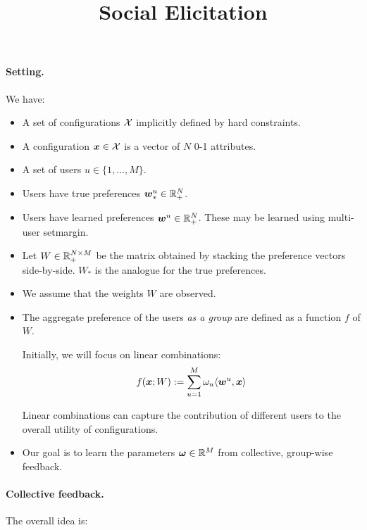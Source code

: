 \documentclass[12pt,a4paper]{article}
\title{Social Elicitation}
\begin{document}
\maketitle

\paragraph{Setting.} We have:

\begin{itemize}

    \item A set of configurations $\mathcal{X}$ implicitly defined by hard constraints.

    \item A configuration $\boldsymbol{x} \in \mathcal{X}$ is a vector of $N$ 0-1 attributes.

    \item A set of users $u \in \{1, \ldots, M\}$.

    \item Users have true preferences $\boldsymbol{w}^u_* \in \mathbb{R}^N_+$.

    \item Users have learned preferences $\boldsymbol{w}^u \in \mathbb{R}^N_+$.  These may be
        learned using multi-user setmargin.

    \item Let $W \in \mathbb{R}^{N \times M}_+$ be the matrix obtained by stacking
        the preference vectors side-by-side. $W_*$ is the analogue for the
        true preferences.

    \item We assume that the weights $W$ are observed.

    \item The aggregate preference of the users \emph{as a group} are
        defined as a function $f$ of $W$.

        Initially, we will focus on linear combinations:
        $$ f(\boldsymbol{x};W) := \sum_{u=1}^M \omega_u \langle \boldsymbol{w}^u, \boldsymbol{x} \rangle $$

        Linear combinations can capture the contribution of different users
        to the overall utility of configurations.

    \item Our goal is to learn the parameters $\boldsymbol{\omega} \in \mathbb{R}^M$ from
        collective, group-wise feedback.

\end{itemize}

\paragraph{Collective feedback.} The overall idea is:
\end{document}
